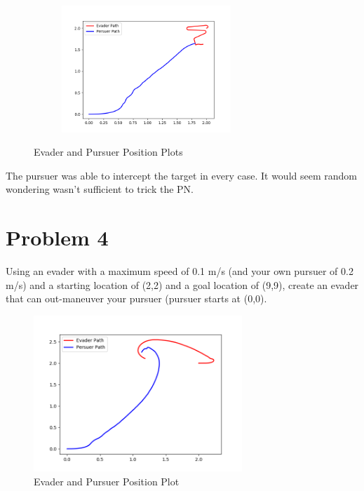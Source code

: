 \documentclass{article}
\begin{document}
\begin{figure}[H]
\begin{subfigure}[b]{0.5\textwidth}
        \label{fig:question3b}
    \end{subfigure}
    \begin{subfigure}[b]{0.5\textwidth}
        \centering
        \includegraphics[width=0.7\textwidth]{images/question3c.png}
        \label{fig:question3c}
    \end{subfigure}
    \caption{Evader and Pursuer Position Plots}
    \label{fig:question3}
\end{figure}

\bigskip
\noindent The pursuer was able to intercept the target in every case. It would seem random wondering wasn't sufficient to trick the PN.

\section*{Problem 4}

Using an evader with a maximum speed of 0.1 m/s (and your own pursuer of 0.2 m/s) and a starting 
location of (2,2) and a goal location of (9,9), create an evader that can out-maneuver your pursuer
(pursuer starts at (0,0).

\bigskip
\begin{figure}[H]
\centering
\includegraphics[width=0.7\textwidth]{images/question4.png}
\caption{Evader and Pursuer Position Plot}
\label{fig:question4}
\end{figure}
\end{document}
